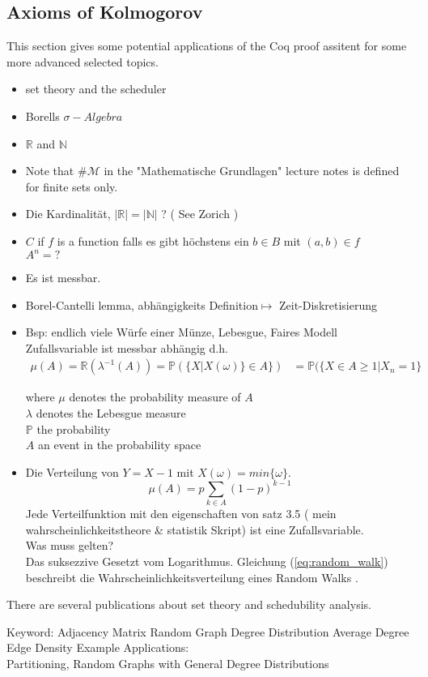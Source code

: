 	
	
	
	
	
\subsection{Axioms of Kolmogorov}
\label{subsec:AxiomsOfKolmogorov }
 
 This section gives some potential applications of the Coq proof assitent for some more advanced selected topics.
 	
 

 \begin{itemize}
	\item set theory and the scheduler	      
 	\item Borells $\sigma-Algebra$
 	\item $\mathbb{R}$ and $\mathbb{N}$
 	\item Note that $\# \mathcal{M}$ in the "Mathematische Grundlagen" lecture notes \cite[]{} is defined for finite sets only.  
	 \item Die Kardinalität, $|\mathbb{R}| = |\mathbb{N}|$ ? ( See Zorich )
 	 \item $C$ if $f$ is a function  falls es gibt höchstens ein $b\in B$ mit $(a,b)\in f$\\
 		 $A^n = ?$
 	\item Es ist messbar.
 \item   Borel-Cantelli lemma, abhängigkeits Definition$\mapsto$ Zeit-Diskretisierung
 \item Bsp: endlich viele Würfe einer Münze, Lebesgue, Faires Modell\\
 		Zufallsvariable ist messbar abhängig d.h. 
 		\begin{align}
 			\mu(A) = \mathbb{R}(\lambda^{-1}(A)) = \mathbb{P} (\{ X| X(\omega)\} \in A \})
 				 & = \mathbb{P}(\{ X \in A \geq 1| X_n = 1 \} 
 		\end{align}  
 		
 		where $\mu$ denotes the probability measure of $A$\\
 		$\lambda$ denotes the Lebesgue measure\\
 		$\mathbb{P}$ the probability\\
 		$A$ an event in the probability space\\
 	
 					
 \item Die Verteilung von $Y = X-1$ mit $X(\omega) = min \{ \omega \}$.
       \begin{equation}\label{eq:random_walk}
       	\mu(A)= p \sum_{k \in A } (1-p) ^{k-1}    	
       	\end{equation}
 		Jede Verteilfunktion mit den eigenschaften von satz 3.5 ( mein wahrscheinlichkeitstheore \& statistik Skript) ist eine Zufallsvariable.\\
 		Was muss gelten?\\
 		Das suksezzive Gesetzt vom Logarithmus.   
   		Gleichung (\ref{eq:random_walk}) beschreibt die Wahrscheinlichkeitsverteilung eines Random Walks . 
 \end{itemize}
 
 
   There are several publications about set theory and schedubility analysis.\par   
   Keyword: Adjacency Matrix Random Graph Degree Distribution Average Degree Edge Density
   Example Applications:\\
   Partitioning, Random Graphs with General Degree Distributions
 		
